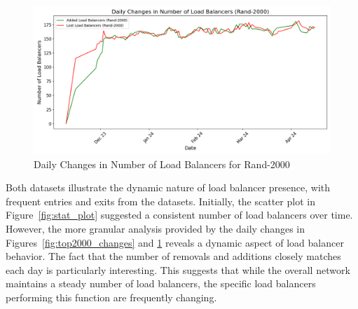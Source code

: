 \documentclass[12pt]{cwru_thesis}
\begin{document}
\begin{figure}[h!]
    \centering
    \includegraphics[width=\linewidth]{figures/load_balancer_changes_Rand-2000.png}
    \caption{Daily Changes in Number of Load Balancers for Rand-2000}
    \label{fig:rand2000_changes}
\end{figure}

Both datasets illustrate the dynamic nature of load balancer presence, with frequent entries and exits from the datasets. Initially, the scatter plot in Figure~\ref{fig:stat_plot} suggested a consistent number of load balancers over time. However, the more granular analysis provided by the daily changes in Figures~\ref{fig:top2000_changes} and \ref{fig:rand2000_changes} reveals a dynamic aspect of load balancer behavior. The fact that the number of removals and additions closely matches each day is particularly interesting. This suggests that while the overall network maintains a steady number of load balancers, the specific load balancers performing this function are frequently changing.\\
\end{document}
